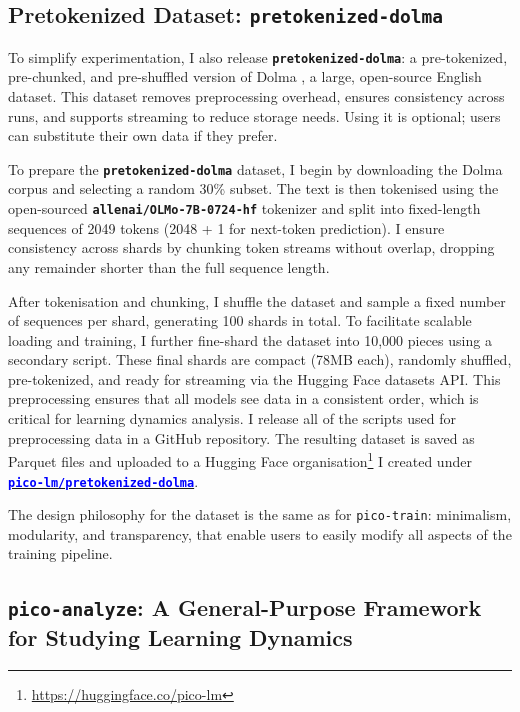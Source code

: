 \subsection{Pretokenized Dataset: \texttt{pretokenized-dolma}}

To simplify experimentation, I also release \textbf{\texttt{pretokenized-dolma}}: a pre-tokenized, pre-chunked, and pre-shuffled version of Dolma \citep{soldaini2024dolma}, a large, open-source English dataset. This dataset removes preprocessing overhead, ensures consistency across runs, and supports streaming to reduce storage needs. Using it is optional; users can substitute their own data if they prefer. 

To prepare the \textbf{\texttt{pretokenized-dolma}} dataset, I begin by downloading the Dolma corpus and selecting a random 30\% subset. The text is then tokenised using the open-sourced \textbf{\texttt{allenai/OLMo-7B-0724-hf}} tokenizer and split into fixed-length sequences of 2049 tokens (2048 + 1 for next-token prediction). I ensure consistency across shards by chunking token streams without overlap, dropping any remainder shorter than the full sequence length.

After tokenisation and chunking, I shuffle the dataset and sample a fixed number of sequences per shard, generating 100 shards in total. To facilitate scalable loading and training, I further fine-shard the dataset into 10,000 pieces using a secondary script. These final shards are compact (78MB each), randomly shuffled, pre-tokenized, and ready for streaming via the Hugging Face datasets API. This preprocessing ensures that all models see data in a consistent order, which is critical for learning dynamics analysis. I release all of the scripts used for preprocessing data in a GitHub repository. The resulting dataset is saved as Parquet files and uploaded to a Hugging Face organisation\footnote{\url{https://huggingface.co/pico-lm}} I created under \href{https://huggingface.co/datasets/pico-lm/pretokenized-dolma}{\textcolor{blue}{\textbf{\texttt{pico-lm/pretokenized-dolma}}}}.

The design philosophy for the dataset is the same as for \texttt{pico-train}: minimalism, modularity, and transparency, that enable users to easily modify all aspects of the training pipeline. 

\subsection{\texttt{pico-analyze}: A General-Purpose Framework for Studying Learning Dynamics}

